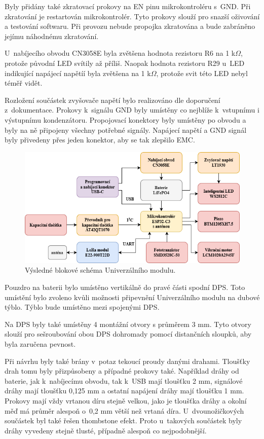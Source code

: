 Byly přidány také zkratovací prokovy na EN pinu mikrokontroléru s~GND. Při zkratování je restartován mikrokontrolér. Tyto prokovy slouží pro snazší oživování a testování softwaru. Při provozu nebude propojka 
zkratována a bude zabráněno jejímu náhodnému zkratování. 

U~nabíjecího obvodu CN3058E byla zvětšena hodnota rezistoru R6 na 1 k$\Omega$, protože původní LED svítily až příliš. Naopak hodnota rezistoru R29 u~LED indikující napájecí napětíí byla zvětšena na 1 k$\Omega$, 
protože svit této LED nebyl téměř vidět. 

Rozložení součástek zvyšovače napětí bylo realizováno dle doporučení z~dokumentace. Prokovy k~signálu GND byly umístěny co nejblíže k~vstupnímu i výstupnímu kondenzátoru. Propojovací konektory byly 
umístěny po obvodu a byly na ně připojeny všechny potřebné signály. Napájecí napětí a GND signál byly přivedeny přes jeden konektor, aby se tak zlepšilo EMC. 

\begin{figure}[!h]
  \begin{center}
    \includegraphics[scale=0.65]{obrazky/blokove_schema_finalni_verze.png}
  \end{center}
  \caption[Výsledné blokové schéma Univerzálního modulu]{Výsledné blokové schéma Univerzálního modulu.}
\end{figure}

Pouzdro na baterii bylo umístěno vertikálně do pravé části spodní DPS. Toto umístění bylo zvoleno kvůli možnosti připevnění Univerzálního modulu na dubové týblo. Týblo bude umístěno mezi spojenými DPS. 

Na DPS byly také umístěny 4 montážní otvory s průměrem 3 mm. Tyto otvory slouží pro sešroubování obou DPS dohromady pomocí distančních sloupků, aby byla zaručena pevnost. 

Při návrhu byly také brány v~potaz tekoucí proudy danými drahami. Tloušťky drah tomu byly přizpůsobeny a případné prokovy také. Například dráhy od baterie, jak k~nabíjecímu obvodu, tak k~USB mají tloušťku
2 mm, signálové dráhy mají tloušťku 0,125 mm a ostatní napájení dráhy mají tloušťku 1 mm. Prokovy mají vždy vrtanou díru stejně velkou, jako je tloušťka dráhy a okolní měď má průměr alespoň o~0,2 mm větší 
než vrtaná díra. U~dvounožičkových součástek byl také řešen thombstone efekt. Proto u~takových součástek byly dráhy vyvedeny stejně tlusté, případně alespoň co nejpodobnější. 
 

